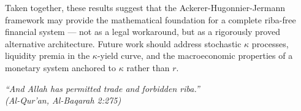 \documentclass[10pt,twocolumn]{article}
\theoremstyle{plain}
\theoremstyle{definition}
\begin{document}
Taken together, these results suggest that the Ackerer-Hugonnier-Jermann
framework may provide the mathematical foundation for a complete
riba-free financial system --- not as a legal workaround, but as
a rigorously proved alternative architecture. Future work should
address stochastic $\kappa$ processes, liquidity premia in the
$\kappa$-yield curve, and the macroeconomic properties of a
monetary system anchored to $\kappa$ rather than $r$.

\bigskip
\noindent\textit{``And Allah has permitted trade and forbidden
\textit{riba}.''}\\
\textit{(Al-Qur'an, Al-Baqarah 2:275)}


\end{document}
